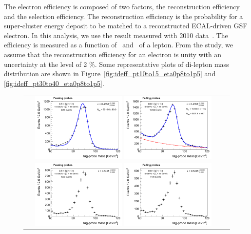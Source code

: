 The electron efficiency is composed of two factors, the reconstruction efficiency and 
the selection efficiency. The reconstruction efficiency is the probability for a 
super-cluster energy deposit to be matched to a reconstructed ECAL-driven 
GSF electron. In this analysis, we use the result measured with 2010 
data~\cite{Khachatryan:2010xn}.  
The efficiency is measured as a function 
of \pt~and \Eta~of a lepton. From the study, we assume that the reconstruction 
efficiency for an electron is unity with an uncertainty at the level of 2 \%.
Some representative plots of di-lepton mass distribution are shown in 
Figure~\ref{fig:ideff_pt10to15_eta0p8to1p5} and \ref{fig:ideff_pt30to40_eta0p8to1p5}. 
%
\begin{figure}[htp] 
\centering 
\begin{tabular}{cc} 
\includegraphics[width=0.45\textwidth]{figures/passetapt_data_1.png} 
\includegraphics[width=0.45\textwidth]{figures/failetapt_data_1.png}  \\
\includegraphics[width=0.45\textwidth]{figures/passetapt_mc_1.png} 
\includegraphics[width=0.45\textwidth]{figures/failetapt_mc_1.png} 

\end{tabular}
\end{figure}
